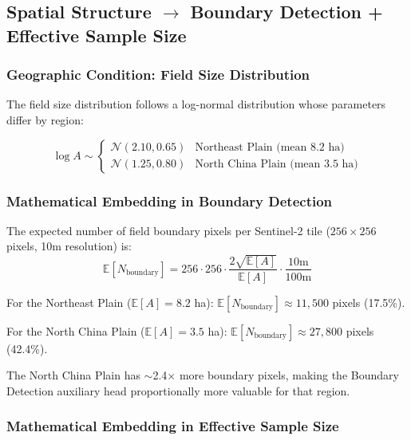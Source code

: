 \subsection{Spatial Structure $\to$ Boundary Detection + Effective Sample Size}

\subsubsection{Geographic Condition: Field Size Distribution}

The field size distribution follows a log-normal distribution whose parameters
differ by region:

\begin{equation}\label{eq:field-size}
    \log A \sim \begin{cases}
        \mathcal{N}(2.10, 0.65) & \text{Northeast Plain (mean 8.2 ha)} \\
        \mathcal{N}(1.25, 0.80) & \text{North China Plain (mean 3.5 ha)}
    \end{cases}
\end{equation}

\subsubsection{Mathematical Embedding in Boundary Detection}

The expected number of field boundary pixels per Sentinel-2 tile ($256 \times 256$
pixels, 10m resolution) is:
\begin{equation}
    \mathbb{E}[N_{\text{boundary}}] = 256 \cdot 256 \cdot
    \frac{2\sqrt{\mathbb{E}[A]}}{\mathbb{E}[A]} \cdot \frac{10\text{m}}{100\text{m}}
\end{equation}

For the Northeast Plain ($\mathbb{E}[A] = 8.2$ ha):
$\mathbb{E}[N_{\text{boundary}}] \approx 11,500$ pixels (17.5\%).

For the North China Plain ($\mathbb{E}[A] = 3.5$ ha):
$\mathbb{E}[N_{\text{boundary}}] \approx 27,800$ pixels (42.4\%).

The North China Plain has $\sim$2.4$\times$ more boundary pixels, making the
Boundary Detection auxiliary head proportionally more valuable for that region.

\subsubsection{Mathematical Embedding in Effective Sample Size}

